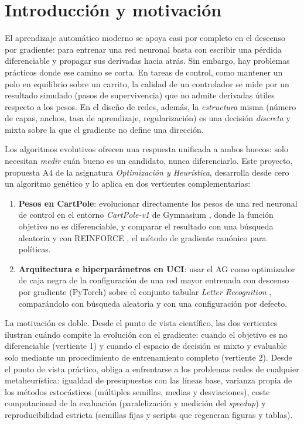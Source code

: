 \section{Introducción y motivación}

El aprendizaje automático moderno se apoya casi por completo en el descenso por gradiente: para entrenar una red neuronal basta con escribir una pérdida diferenciable y propagar sus derivadas hacia atrás. Sin embargo, hay problemas prácticos donde ese camino se corta. En tareas de control, como mantener un polo en equilibrio sobre un carrito, la calidad de un controlador se mide por un resultado simulado (pasos de supervivencia) que no admite derivadas útiles respecto a los pesos. En el diseño de redes, además, la \emph{estructura} misma (número de capas, anchos, tasa de aprendizaje, regularización) es una decisión \emph{discreta} y mixta sobre la que el gradiente no define una dirección.

Los algoritmos evolutivos ofrecen una respuesta unificada a ambos huecos: solo necesitan \emph{medir} cuán bueno es un candidato, nunca diferenciarlo. Este proyecto, propuesta A4 de la asignatura \emph{Optimización y Heurística}, desarrolla desde cero un algoritmo genético y lo aplica en dos vertientes complementarias:

\begin{enumerate}
  \item \textbf{Pesos en CartPole}: evolucionar directamente los pesos de una red neuronal de control en el entorno \emph{CartPole-v1} de Gymnasium \citep{brockman2016}, donde la función objetivo no es diferenciable, y comparar el resultado con una búsqueda aleatoria y con REINFORCE \citep{williams1992}, el método de gradiente canónico para políticas.
  \item \textbf{Arquitectura e hiperparámetros en UCI}: usar el AG como optimizador de caja negra de la configuración de una red mayor entrenada con descenso por gradiente (PyTorch) sobre el conjunto tabular \emph{Letter Recognition} \citep{frey1991}, comparándolo con búsqueda aleatoria y con una configuración por defecto.
\end{enumerate}

La motivación es doble. Desde el punto de vista científico, las dos vertientes ilustran cuándo compite la evolución con el gradiente: cuando el objetivo es no diferenciable (vertiente 1) y cuando el espacio de decisión es mixto y evaluable solo mediante un procedimiento de entrenamiento completo (vertiente 2). Desde el punto de vista práctico, obliga a enfrentarse a los problemas reales de cualquier metaheurística: igualdad de presupuestos con las líneas base, varianza propia de los métodos estocásticos (múltiples semillas, medias y desviaciones), coste computacional de la evaluación (paralelización y medición del \emph{speedup}) y reproducibilidad estricta (semillas fijas y scripts que regeneran figuras y tablas).

